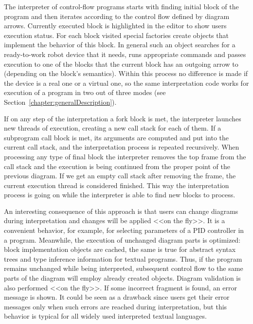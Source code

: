 \documentclass[conference]{IEEEtran}
\begin{document}
The interpreter of control-flow programs starts with finding initial block of the program and then iterates according to the control flow defined by diagram arrows. Currently executed block is highlighted in the editor to show users execution status. For each block visited special factories create objects that implement the behavior of this block. In general such an object searches for a ready-to-work robot device that it needs, runs appropriate commands and passes execution to one of the blocks that the current block has an outgoing arrow to (depending on the block's semantics). Within this process no difference is made if the device is a real one or a virtual one, so the same interpretation code works for execution of a program in two out of three modes (see Section~\ref{chapter:generalDescription}).

If on any step of the interpretation a fork block is met, the interpreter launches new threads of execution, creating a new call stack for each of them. If a subprogram call block is met, its arguments are computed and put into the current call stack, and the interpretation process is repeated recursively. When processing any type of final block the interpreter removes the top frame from the call stack and the execution is being continued from the proper point of the previous diagram. If we get an empty call stack after removing the frame, the current execution thread is considered finished. This way the interpretation process is going on while the interpreter is able to find new blocks to process.

An interesting consequence of this approach is that users can change diagrams during interpretation and changes will be applied <<on the fly>>. It is a convenient behavior, for example, for selecting parameters of a PID controller in a program. Meanwhile, the execution of unchanged diagram parts is optimized: block implementation objects are cached, the same is true for abstract syntax trees and type inference information for textual programs. Thus, if the program remains unchanged while being interpreted, subsequent control flow to the same parts of the diagram will employ already created objects. Diagram validation is also performed <<on the fly>>. If some incorrect fragment is found, an error message is shown. It could be seen as a drawback since users get their error messages only when such errors are reached during interpretation, but this behavior is typical for all widely used interpreted textual languages.
\end{document}

